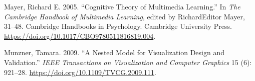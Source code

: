 \hypertarget{refs}{}
\begin{CSLReferences}{1}{0}
\leavevmode{}%
Mayer, Richard E. 2005. {``Cognitive Theory of Multimedia Learning.''} In \emph{The Cambridge Handbook of Multimedia Learning}, edited by RichardEditor Mayer, 31--48. Cambridge Handbooks in Psychology. Cambridge University Press. \url{https://doi.org/10.1017/CBO9780511816819.004}.

\leavevmode{}%
Munzner, Tamara. 2009. {``A Nested Model for Visualization Design and Validation.''} \emph{IEEE Transactions on Visualization and Computer Graphics} 15 (6): 921--28. \url{https://doi.org/10.1109/TVCG.2009.111}.

\end{CSLReferences}



\address{%
Krisanat Anukarnsakulchularp\\
Monash University\\%
Faculty of Business and Economics\\ Melbourne, Australia\\
%
%
\textit{ORCiD: \href{https://orcid.org/0009-0008-5638-7124}{0009-0008-5638-7124}}\\%
\href{mailto:kanu0003@student.monash.edu}{\nolinkurl{kanu0003@student.monash.edu}}%
}
